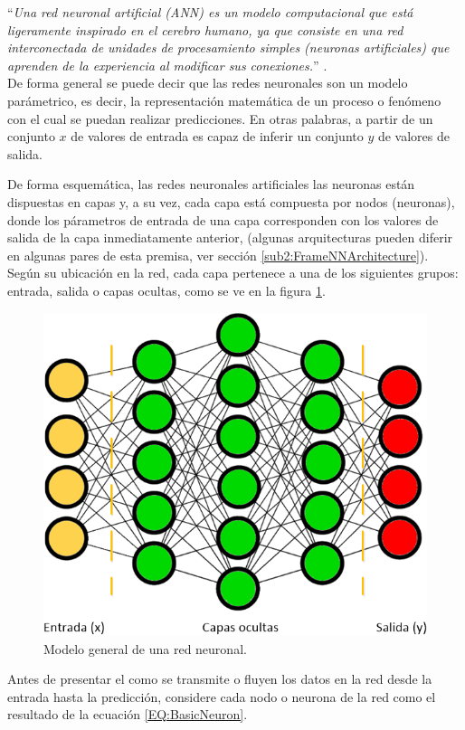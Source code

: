  		    ``\textit{Una red neuronal artificial (ANN) es un modelo computacional que está ligeramente inspirado en el cerebro humano, ya que consiste en una red interconectada de unidades de procesamiento simples (neuronas artificiales) que aprenden de la experiencia al modificar sus conexiones.}'' \cite{VanGerven2017}. \\
        
            De forma general se puede decir que las redes neuronales son un modelo parámetrico, es decir, la representación matemática de un proceso o fenómeno con el cual se puedan realizar predicciones. En otras palabras, a partir de un conjunto $x$ de valores de entrada es capaz de inferir un conjunto $y$ de valores de salida. 
            
            De forma esquemática, las redes neuronales artificiales las neuronas están dispuestas en capas y, a su vez, cada capa está compuesta por nodos (neuronas), donde los párametros de entrada de una capa corresponden con los valores de salida de la capa inmediatamente anterior, (algunas arquitecturas pueden diferir en algunas pares de esta premisa, ver sección \ref{sub2:FrameNNArchitecture}). Según su ubicación en la red, cada capa pertenece a una de los siguientes grupos: entrada, salida o capas ocultas, como se ve en la figura \ref{fig:GeneralNN}.
            
            \begin{figure}[ht!]
            	\centering
            	\includegraphics[width=0.6\linewidth]{imgs/02-Referential/02-GeneralNN.png}
            	\caption[Modelo general de una red neuronal]{Modelo general de una red neuronal.}
        	    \label{fig:GeneralNN}
            \end{figure}%
            
            Antes de presentar el como se transmite o fluyen los datos en la red desde la entrada hasta la predicción, considere cada nodo o neurona de la red como el resultado de la ecuación \ref{EQ:BasicNeuron}.
            
